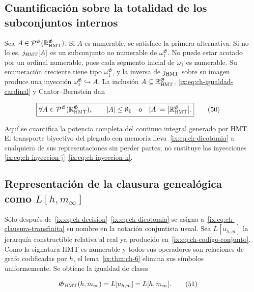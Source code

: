 \subsection{Cuantificación sobre la totalidad de los subconjuntos internos}

Sea
\(A\in\mathcal P^{\mathfrak G}
(\mathbb R_{\rm HMT}^{\mathfrak G})\). Si \(A\) es numerable, se satisface la
primera alternativa. Si no lo es, \(j_{\rm HMT}[A]\) es un subconjunto no
numerable de \(\omega_1^{\mathfrak G}\). No puede estar acotado por un ordinal
numerable, pues cada segmento inicial de \(\omega_1\) es numerable. Su
enumeración creciente tiene tipo \(\omega_1^{\mathfrak G}\), y la inversa de
\(j_{\rm HMT}\) sobre su imagen produce una inyección
\(\omega_1^{\mathfrak G}\hookrightarrow A\). La inclusión
\(A\subseteq\mathbb R_{\rm HMT}^{\mathfrak G}\), \eqref{ix:eq:ch-igualdad-cardinal} y
Cantor--Bernstein dan

\[
 \boxed{
 \forall A\in\mathcal P^{\mathfrak G}
   (\mathbb R_{\rm HMT}^{\mathfrak G}),\qquad
 |A|\le\aleph_0
 \quad\text{o}\quad
 |A|=\bigl|\mathbb R_{\rm HMT}^{\mathfrak G}\bigr|.}
\tag{50}\label{ix:eq:ch-dicotomia}
\]

Aquí se cuantifica la potencia completa del continuo integral generado por
HMT. El transporte biyectivo del plegado con memoria lleva~\eqref{ix:eq:ch-dicotomia} a cualquiera
de sus representaciones sin perder partes; no sustituye las inyecciones
\eqref{ix:eq:ch-inyeccion-j}--\eqref{ix:eq:ch-inyeccion-k}.

\subsection{Representación de la clausura genealógica como \texorpdfstring{\(L[h,m_\infty]\)}{L[h,m-infinito]}}

Sólo después de~\eqref{ix:eq:ch-decision}--\eqref{ix:eq:ch-dicotomia} se asigna
a~\eqref{ix:eq:ch-clausura-transfinita} su nombre en la notación
conjuntista usual. Sea \(L[u_{h,m}]\) la jerarquía constructible relativa al
real ya producido en~\eqref{ix:eq:ch-codigo-conjunto}. Como la signatura HMT es numerable y todos sus
operadores son relaciones de grafo codificadas por \(h\), el lema~\ref{ix:thm:ch-6} elimina
sus símbolos uniformemente. Se obtiene la igualdad de clases

\[
 \mathfrak G_{\rm HMT}(h,m_\infty)
 =L[u_{h,m}]=L[h,m_\infty].
\tag{51}\label{ix:eq:ch-representacion-L}
\]

